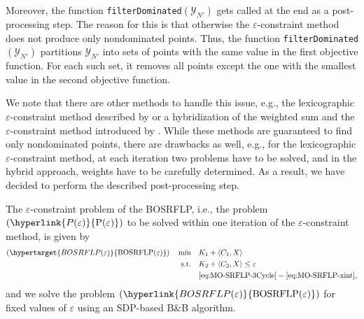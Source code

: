 \documentclass{article}
\newcommand{\mytag}[1]{(\hypertarget{#1}{\mathrm{#1}})}
\newcommand{\myrefmath}[1]{(\hyperlink{#1}{\mathrm{#1}})}
\newcommand{\BB}{B\&B\xspace}
\newcommand{\BOSRFLP}{BOSRFLP\xspace}
\begin{document}
Moreover, the function \texttt{filterDominated}$(\mathcal Y_{N'})$ gets called at the end as a post-processing step. The reason for this is that otherwise 
the $\varepsilon$-constraint method does not produce only nondominated points. 
Thus, the function \texttt{filterDominated}$(\mathcal Y_{N'})$ partitions $\mathcal Y_{N'}$ into sets of points with the same value in the first objective function. For each such set, it removes all points except the one with the smallest value in the second objective function. 

We note that there are other methods to handle this issue, e.g., the lexicographic $\varepsilon$-constraint method described by \citet[Chapter 6]{Cohen1978} or a hybridization of the weighted sum and the $\varepsilon$-constraint method introduced by \citet{Neumayer1994}. While these methods are guaranteed to find only nondominated points, there are drawbacks as well, e.g., for the lexicographic $\varepsilon$-constraint method, at each iteration two problems have to be solved, and in the hybrid approach, weights have to be carefully determined.
As a result, we have decided to perform the described post-processing step.

The $\varepsilon$-constraint problem of the \BOSRFLP, i.e., the problem $\myrefmath{P(\varepsilon)}$ to be solved within one iteration of the $\varepsilon$-constraint method, is given by
\begin{subequations}
    \begin{align}
        \mytag{BOSRFLP(\varepsilon)} \quad \min \quad &K_1 + \langle C_1,X \rangle \label{eq:BO-obj}\\
        \text{s.t.} \quad & K_2 + \langle C_2, X \rangle \leq \varepsilon \label{eq:BO-eps} \\ 
        & \eqref{eq:MO-SRFLP-3Cycle}-\eqref{eq:MO-SRFLP-xint},
        \label{eq:BO-rest}
    \end{align}
\end{subequations}
and we solve the problem $\myrefmath{BOSRFLP(\varepsilon)}$ for fixed values of $\varepsilon$ using an SDP-based \BB algorithm. 
\end{document}

